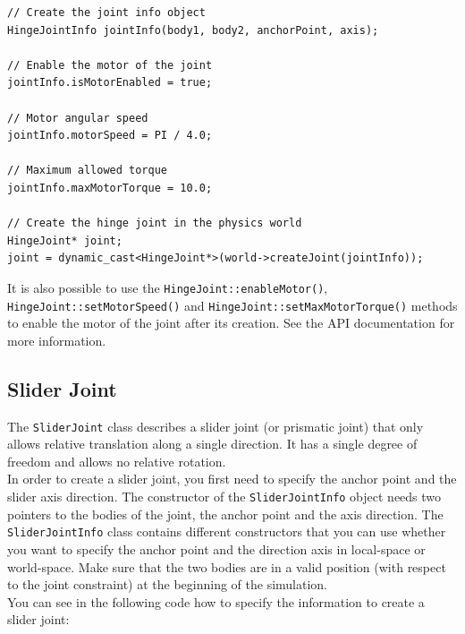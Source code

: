 \documentclass[a4paper,12pt]{article}
\begin{document}
     \begin{lstlisting}
// Create the joint info object
HingeJointInfo jointInfo(body1, body2, anchorPoint, axis);

// Enable the motor of the joint
jointInfo.isMotorEnabled = true;

// Motor angular speed
jointInfo.motorSpeed = PI / 4.0;

// Maximum allowed torque
jointInfo.maxMotorTorque = 10.0;

// Create the hinge joint in the physics world
HingeJoint* joint;
joint = dynamic_cast<HingeJoint*>(world->createJoint(jointInfo));
  \end{lstlisting}

     \vspace{0.6cm}

     \begin{sloppypar}
        It is also possible to use the \texttt{HingeJoint::enableMotor()}, \texttt{HingeJoint::setMotorSpeed()} and
	     \texttt{HingeJoint::setMaxMotorTorque()} methods to
        enable the motor of the joint after its creation. See the API documentation for more information.
     \end{sloppypar}

    \subsection{Slider Joint}

    The \texttt{SliderJoint} class describes a slider joint (or prismatic joint) that only allows relative translation along a single direction.
    It has a single degree of freedom and allows no relative rotation. \\

    In order to create a slider joint, you first need to specify the anchor point and the slider axis direction.
    The constructor of the \texttt{SliderJointInfo} object needs two pointers to the bodies of the joint, the anchor point and the axis direction.
    The \texttt{SliderJointInfo} class contains different constructors that you can use whether you want to specify the anchor point and the direction axis
    in local-space or world-space. Make sure that the two bodies are in a valid position (with respect to the joint constraint) at the beginning
    of the simulation.\\

    You can see in the following code how to specify the information to create a slider joint: \\
\end{document}
